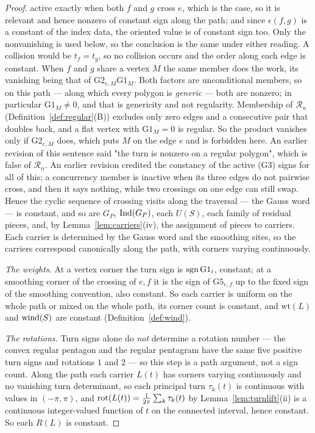 \begin{proof}
active exactly when both $f$ and $g$ cross $e$, which is the case, so it is
relevant and hence nonzero of constant sign along the path; and since
$\epsilon(f,g)$ is a constant of the index data, the oriented value is of
constant sign too. Only the nonvanishing is used below, so the conclusion is
the same under either reading. A collision would be $t_f=t_g$, so no collision occurs and the
order along each edge is constant. When $f$ and $g$ share a vertex $M$ the same
member does the work, its vanishing being that of
$\mathrm{G2}_{e,M}\mathrm{G1}_M$. Both factors are unconditional members, so on
this path --- along which every polygon is \emph{generic} --- both are nonzero;
in particular $\mathrm{G1}_M\neq0$, and that is genericity and not regularity.
Membership of $\mathcal R_n$ (Definition~\ref{def:regular}(B)) excludes only zero
edges and a consecutive pair that doubles back, and a flat vertex with
$\mathrm{G1}_M=0$ is regular. So the product vanishes only if
$\mathrm{G2}_{e,M}$ does, which puts $M$ on the edge $e$ and is forbidden here.
An earlier revision of this sentence said "the turn is nonzero on a regular
polygon", which is false of $\mathcal R_n$. An earlier revision credited
the constancy of the active (G3) signs for all of this; a concurrency member is
inactive when its three edges do not pairwise cross, and then it says nothing,
while two crossings on one edge can still swap. Hence the cyclic sequence of crossing visits along
the traversal --- the Gauss word --- is constant, and so are $G_P$, $\operatorname{Ind}(G_P)$,
each $U(S)$, each family of residual pieces, and, by
Lemma~\ref{lem:carriers}(iv), the assignment of pieces to carriers. Each
carrier is determined by the Gauss word and the smoothing sites, so the carriers
correspond canonically along the path, with corners varying continuously.

\emph{The weights.} At a vertex corner the turn sign is $\operatorname{sgn}\mathrm{G1}_i$,
constant; at a smoothing corner of the crossing of $e,f$ it is the sign of
$\mathrm{G5}_{e,f}$ up to the fixed sign of the smoothing convention, also
constant. So each carrier is uniform on the whole path or mixed on the whole
path, its corner count is constant, and $\mathrm{wt}(L)$ and $\operatorname{wind}(S)$ are
constant (Definition~\ref{def:wind}).

\emph{The rotations.} Turn signs alone do \emph{not} determine a rotation
number --- the convex regular pentagon and the regular pentagram have the same
five positive turn signs and rotations $1$ and $2$ --- so this step is a path
argument, not a sign count. Along the path each carrier $L(t)$ has corners
varying continuously and no vanishing turn determinant, so each principal turn
$\tau_k(t)$ is continuous with values in $(-\pi,\pi)$, and
$\operatorname{rot}(L(t))=\frac1{2\pi}\sum_k\tau_k(t)$ by Lemma~\ref{lem:turnlift}(ii) is a
continuous integer-valued function of $t$ on the connected interval, hence
constant. So each $R(L)$ is constant.


\end{proof}
